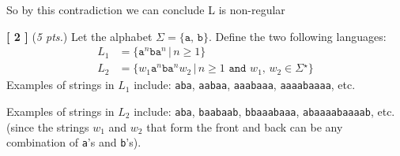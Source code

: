 \documentclass[leqno,11pt]{article}
\newcommand{\set}[1]%
	{\ensuremath{ \{ #1 \} }}
\newcommand{\suth}{\ensuremath{ \,|\, }}
\newcommand{\str}%
	{\ensuremath{^{\star}}}
\newcommand{\qn}[1]%
	{\noindent \textbf{[ #1 ]}\quad}
\begin{document}
So by this contradiction we can conclude L is non-regular 

\vspace{16pt}

\qn{2} (\emph{5 pts.}) Let the alphabet $\Sigma = \set{\texttt{a},\, \texttt{b}}$.  Define the two
following languages:
\begin{align*}
	L_1 &= \set{\texttt{a}^n \texttt{ba}^n \suth n \geq 1} \\
	L_2 &= \set{w_1 \texttt{a}^n \texttt{ba}^n w_2 \suth n \geq 1 \texttt{ and } w_1,\, w_2 \in \Sigma\str}
\end{align*}
Examples of strings in $L_1$ include: \texttt{aba}, \texttt{aabaa}, \texttt{aaabaaa}, \texttt{aaaabaaaa}, etc. 

\vspace{6pt}\noindent 
Examples of strings in $L_2$ include: \texttt{aba}, \texttt{baabaab}, \texttt{bbaaabaaa}, \texttt{abaaaabaaaab}, etc. 
(since the strings $w_1$ and $w_2$ that form the front and back can be any combination of \texttt{a}'s and
\texttt{b}'s).
\end{document}
